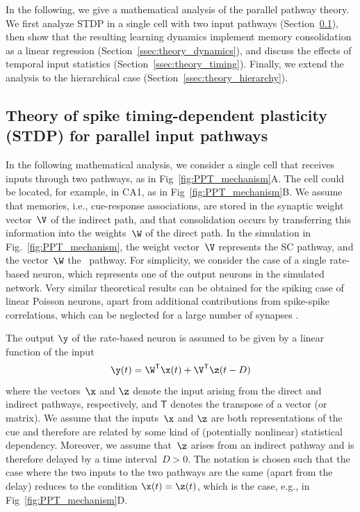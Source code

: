 \label{sec:theoretical_analysis}

In the following, we give a mathematical analysis of the parallel pathway theory. We first analyze STDP in a single cell with two input pathways (Section~\ref{ssec:theory_stdp}), then show that the resulting learning dynamics implement memory consolidation as a linear regression (Section~\ref{ssec:theory_dynamics}), and discuss the effects of temporal input statistics (Section~\ref{ssec:theory_timing}). Finally, we extend the analysis to the hierarchical case (Section~\ref{ssec:theory_hierarchy}).

\subsection{Theory of spike timing-dependent plasticity (STDP) for parallel input pathways}
\label{ssec:theory_stdp}

In the following mathematical analysis, we consider a single cell  that receives inputs through two pathways, as in Fig~\ref{fig:PPT_mechanism}A.
The cell could be located, for example, in CA1, as in Fig~\ref{fig:PPT_mechanism}B.
We assume that memories, i.e., cue-response associations, are stored  in the synaptic weight vector~$\V$ of the indirect path, and that consolidation occurs by transferring this information into the weights~$\W$ of the direct path. In the simulation in Fig.~\ref{fig:PPT_mechanism}, the weight vector~$\V$ represents the SC pathway, and the vector~$\W$ the \ppca~pathway. For simplicity, we consider the case of a single rate-based neuron, which represents one of the output neurons in the simulated network.
Very similar theoretical results can be obtained for the spiking case of linear Poisson neurons, apart from additional contributions from spike-spike correlations, which can be neglected for a large number of synapses \cite{Kempter1999}.

The output $\y$ of the rate-based neuron is assumed to be given by a linear function of the input
\begin{equation}
\y(t) = \W^\mathsf{T} \x(t) + \V^\mathsf{T} \z(t-D)
\label{eq:output}
\end{equation}
where the vectors~$\x$ and $\z$ denote the input arising from the direct and indirect pathways, respectively, and $\mathsf{T}$ denotes the transpose of a vector (or matrix). We assume that the inputs~$\x$ and $\z$ are both representations of the cue and therefore are related by some kind of (potentially nonlinear) statistical dependency. Moreover, we assume that~$\z$ arises from an indirect pathway and is therefore delayed by a time interval~$D>0$. The notation is chosen such that the case where the two inputs to the two pathways are the same (apart from the delay) reduces to the condition $\x(t)=\z(t)$, which is the case, e.g., in Fig~\ref{fig:PPT_mechanism}D.

